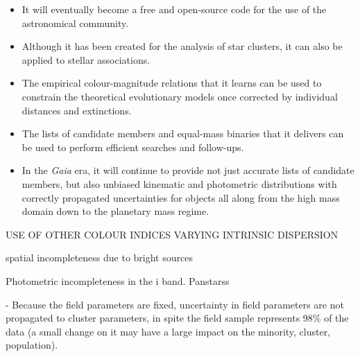 \begin{itemize}
\item It will eventually become a free and open-source code for the use of the astronomical community.
\item Although it has been created for the analysis of star clusters, it can also be applied to stellar associations.
\item The empirical colour-magnitude relations that it learns can be used to constrain the theoretical evolutionary models once corrected by individual distances and extinctions.
\item The lists of candidate members and equal-mass binaries that it delivers can be used to perform efficient searches and follow-ups.
\item In the \emph{Gaia} era, it will continue to provide not just accurate lists of candidate members, but also unbiased kinematic and photometric distributions with correctly propagated uncertainties for objects all along from the high mass domain down to the planetary mass regime.
\end{itemize}

USE OF OTHER COLOUR INDICES
VARYING INTRINSIC DISPERSION

spatial incompleteness due to bright sources

Photometric incompleteness in the i band. Panstarss

- Because the field parameters are fixed, uncertainty in field parameters are not propagated to cluster parameters, in spite the field sample represents 98\% of the data (a small change on it may have a large impact on the minority, cluster, population).






